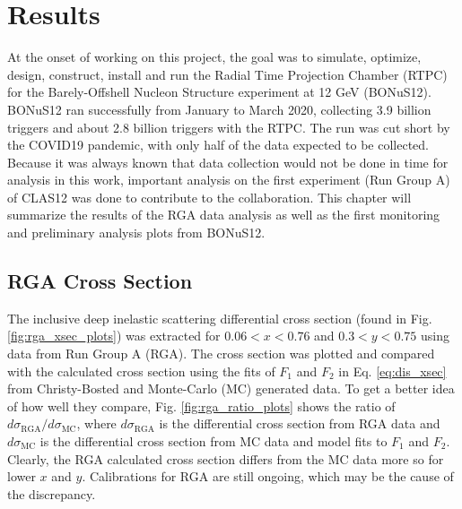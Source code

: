 \chapter{Results}
\label{ch:results}
At the onset of working on this project, the goal was to simulate, optimize, design, construct, install and run the Radial Time Projection Chamber (RTPC) for the Barely-Offshell Nucleon Structure experiment at 12 GeV (BONuS12). BONuS12 ran successfully from January to March 2020, collecting 3.9 billion triggers and about 2.8 billion triggers with the RTPC. The run was cut short by the COVID19 pandemic, with only half of the data expected to be collected. Because it was always known that data collection would not be done in time for analysis in this work, important analysis on the first experiment (Run Group A) of CLAS12 was done to contribute to the collaboration. This chapter will summarize the results of the RGA data analysis as well as the first monitoring and preliminary analysis plots from BONuS12.

\section{RGA Cross Section}
The inclusive deep inelastic scattering differential cross section (found in Fig. \ref{fig:rga_xsec_plots}) was extracted for $0.06 < x < 0.76$ and $0.3< y < 0.75$ using data from Run Group A (RGA). The cross section was plotted and compared with the calculated cross section using the fits of $F_1$ and $F_2$ in Eq. \ref{eq:dis_xsec} from Christy-Bosted and Monte-Carlo (MC) generated data. To get a better idea of how well they compare, Fig. \ref{fig:rga_ratio_plots} shows the ratio of $d\sigma_{\mathrm{RGA}}/d\sigma_{\mathrm{MC}}$, where $d\sigma_{\mathrm{RGA}}$ is the differential cross section from RGA data and $d\sigma_{\mathrm{MC}}$ is the differential cross section from MC data and model fits to $F_1$ and $F_2$. Clearly, the RGA calculated cross section differs from the MC data more so for lower $x$ and $y$. Calibrations for RGA are still ongoing, which may be the cause of the discrepancy.


